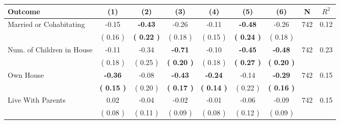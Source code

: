 \begin{tabular}{lcccccccc}
\toprule
 \textbf{Outcome} & \textbf{(1)} & \textbf{(2)} & \textbf{(3)} & \textbf{(4)} & \textbf{(5)} & \textbf{(6)} & \textbf{N} & \textbf{$ R^2$} \\
\midrule
Married or Cohabitating &     -0.15 & \textbf{    -0.43} &     -0.26 &     -0.11 & \textbf{    -0.48} &     -0.26 & 742 &       0.12 \\ 
 & (     0.16 ) & \textbf{(     0.22 )} & (     0.18 ) & (     0.15 ) & \textbf{(     0.24 )} & (     0.18 ) & \\
Num. of Children in House &     -0.11 &     -0.34 & \textbf{    -0.71} &     -0.10 & \textbf{    -0.45} & \textbf{    -0.48} & 742 &       0.23 \\ 
 & (     0.18 ) & (     0.25 ) & \textbf{(     0.20 )} & (     0.18 ) & \textbf{(     0.27 )} & \textbf{(     0.20 )} & \\
Own House & \textbf{    -0.36} &     -0.08 & \textbf{    -0.43} & \textbf{    -0.24} &     -0.14 & \textbf{    -0.29} & 742 &       0.15 \\ 
 & \textbf{(     0.15 )} & (     0.20 ) & \textbf{(     0.17 )} & \textbf{(     0.14 )} & (     0.22 ) & \textbf{(     0.16 )} & \\
Live With Parents &      0.02 &     -0.04 &     -0.02 &     -0.01 &     -0.06 &     -0.09 & 742 &       0.15 \\ 
 & (     0.08 ) & (     0.11 ) & (     0.09 ) & (     0.08 ) & (     0.12 ) & (     0.09 ) & \\
\bottomrule
\end{tabular}
